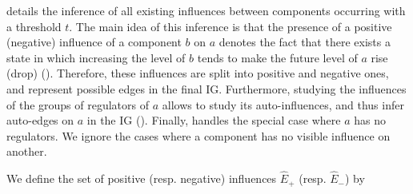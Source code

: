 details the inference of all existing influences between components occurring
with a threshold $t$.
The main idea of this inference is that
the presence of a positive (negative) influence of a component $b$ on $a$ denotes the fact that
there exists a state in which increasing the level of $b$ tends to make the future level of $a$ rise (drop)
().
Therefore, these influences are split into positive and negative ones, and represent possible edges in the final IG.
Furthermore, studying the influences of the groups of regulators of $a$
allows to study its auto-influences, and thus infer auto-edges on $a$ in the IG ().
Finally,  handles the special case where $a$ has no regulators.
We ignore the cases where a component has no visible influence on another.
%
\begin{proposition}\label{pps:inference-edges}
We define the set of positive (resp. negative) influences $\hat{E}_+$ (resp.
$\hat{E}_-$) by
\end{proposition}

